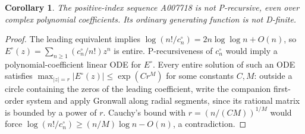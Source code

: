 \documentclass[11pt,a4paper]{article}
\newtheorem{corollary}[theorem]{Corollary}%
\theoremstyle{remark}\newtheorem{remark}[theorem]{Remark}%
\begin{document}
\begin{corollary}\label{bpm:sym:cor:nonP}
The positive-index sequence A007718 is not P-recursive, even over complex polynomial coefficients. Its ordinary generating function is not D-finite.
\end{corollary}
\begin{proof}
The leading equivalent implies
$\log(n!/c^\circ_n)=2n\log\log n+O(n)$, so $E^\circ(z)=\sum_{n\ge1}(c^\circ_n/n!)z^n$ is entire. P-recursiveness of $c^\circ_n$ would imply a polynomial-coefficient linear ODE for $E^\circ$. Every entire solution of such an ODE satisfies $\max_{|z|=r}|E^\circ(z)|\le\exp(Cr^M)$ for some constants $C,M$: outside a circle containing the zeros of the leading coefficient, write the companion first-order system and apply Gronwall along radial segments, since its rational matrix is bounded by a power of $r$. Cauchy's bound with $r=(n/(CM))^{1/M}$ would force $\log(n!/c^\circ_n)\ge(n/M)\log n-O(n)$, a contradiction.
\end{proof}
\end{document}
